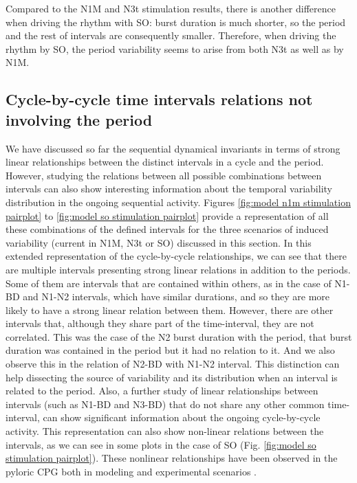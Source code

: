 
Compared to the N1M and N3t stimulation results, there is another difference when driving the rhythm with SO: burst duration is much shorter, so the period and the rest of intervals are consequently smaller. Therefore, when driving the rhythm by SO, the period variability seems to arise from both N3t as well as by N1M. 



\subsection{Cycle-by-cycle time intervals relations not involving the period}
We have discussed so far the sequential dynamical invariants in terms of strong linear relationships between the distinct intervals in a cycle and the period.  However, studying the relations between all possible combinations between intervals can also show interesting information about the temporal variability distribution in the ongoing sequential activity. Figures \ref{fig:model n1m stimulation pairplot} to \ref{fig:model so stimulation pairplot} provide a representation of all these combinations of the defined intervals for the three scenarios of induced variability (current in N1M, N3t or SO) discussed in this section. In this extended representation of the cycle-by-cycle relationships, we can see that there are multiple intervals presenting strong linear relations in addition to the periods. Some of them are intervals that are contained within others, as in the case of N1-BD and N1-N2 intervals, which have similar durations, and so they are more likely to have a strong linear relation between them. However, there are other intervals that, although they share part of the time-interval, they are not correlated. This was the case of the N2 burst duration with the period, that burst duration was contained in the period but it had no relation to it. And we also observe this in the relation of N2-BD with N1-N2 interval. This distinction can help dissecting the source of variability and its distribution when an interval is related to the period. Also, a further study of linear relationships between  intervals (such as N1-BD and N3-BD) that do not share any other common time-interval, can show significant information about the ongoing cycle-by-cycle activity. This representation can also show non-linear relations between the intervals, as we can see in some plots in the case of SO (Fig. \ref{fig:model so stimulation pairplot}). These nonlinear relationships have been observed in the pyloric CPG both in modeling and experimental scenarios \parencite{berbel_emergence_2024}.

